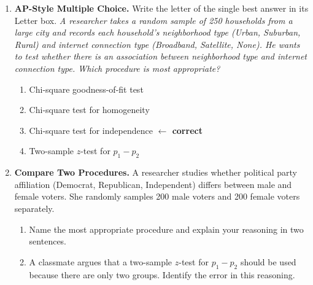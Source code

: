 \documentclass[10pt]{article}
\begin{document}
\begin{enumerate}
\vspace{0.10in}

\boxguard[12]
\item \textbf{AP-Style Multiple Choice.} Write the letter of the single best answer in its Letter box. \;
      \textit{A researcher takes a random sample of 250 households from a large city and records
      each household's neighborhood type (Urban, Suburban, Rural) and internet connection type
      (Broadband, Satellite, None). He wants to test whether there is an association between
      neighborhood type and internet connection type. Which procedure is most appropriate?}

      \begin{enumerate}[label=(\Alph*)]
        \item Chi-square goodness-of-fit test
        \item Chi-square test for homogeneity
        \item Chi-square test for independence \textcolor{keyred}{\textbf{$\leftarrow$ correct}}
        \item Two-sample $z$-test for $p_1 - p_2$
              \hfill{}
      \end{enumerate}

\vspace{0.10in}

\newpage
\item \textbf{Compare Two Procedures.} \;
      A researcher studies whether political party affiliation (Democrat, Republican, Independent)
      differs between male and female voters. She randomly samples 200 male voters and 200 female
      voters separately.

      \begin{enumerate}[label=\alph*.]
        \boxguard[16]
        \item Name the most appropriate procedure and explain your reasoning in two sentences.

        \boxguard[16]
        \item A classmate argues that a two-sample $z$-test for $p_1 - p_2$ should be used
              because there are only two groups. Identify the error in this reasoning.


\end{enumerate}
\end{enumerate}
\end{document}
